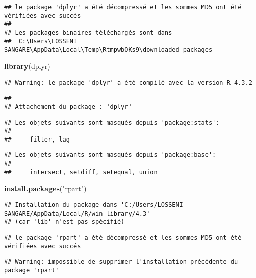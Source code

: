 \documentclass[
]{article}
\newenvironment{Shaded}{\begin{snugshade}}{\end{snugshade}}
\newcommand{\FunctionTok}[1]{\textcolor[rgb]{0.13,0.29,0.53}{\textbf{#1}}}
\newcommand{\NormalTok}[1]{#1}
\newcommand{\StringTok}[1]{\textcolor[rgb]{0.31,0.60,0.02}{#1}}
\begin{document}
\begin{verbatim}
## le package 'dplyr' a été décompressé et les sommes MD5 ont été vérifiées avec succés
## 
## Les packages binaires téléchargés sont dans
##  C:\Users\LOSSENI SANGARE\AppData\Local\Temp\RtmpwbOKs9\downloaded_packages
\end{verbatim}

\begin{Shaded}
\begin{Highlighting}[]
\FunctionTok{library}\NormalTok{(dplyr)}
\end{Highlighting}
\end{Shaded}

\begin{verbatim}
## Warning: le package 'dplyr' a été compilé avec la version R 4.3.2
\end{verbatim}

\begin{verbatim}
## 
## Attachement du package : 'dplyr'
\end{verbatim}

\begin{verbatim}
## Les objets suivants sont masqués depuis 'package:stats':
## 
##     filter, lag
\end{verbatim}

\begin{verbatim}
## Les objets suivants sont masqués depuis 'package:base':
## 
##     intersect, setdiff, setequal, union
\end{verbatim}

\begin{Shaded}
\begin{Highlighting}[]
\FunctionTok{install.packages}\NormalTok{(}\StringTok{"rpart"}\NormalTok{)}
\end{Highlighting}
\end{Shaded}

\begin{verbatim}
## Installation du package dans 'C:/Users/LOSSENI SANGARE/AppData/Local/R/win-library/4.3'
## (car 'lib' n'est pas spécifié)
\end{verbatim}

\begin{verbatim}
## le package 'rpart' a été décompressé et les sommes MD5 ont été vérifiées avec succés
\end{verbatim}

\begin{verbatim}
## Warning: impossible de supprimer l'installation précédente du package 'rpart'
\end{verbatim}
\end{document}
